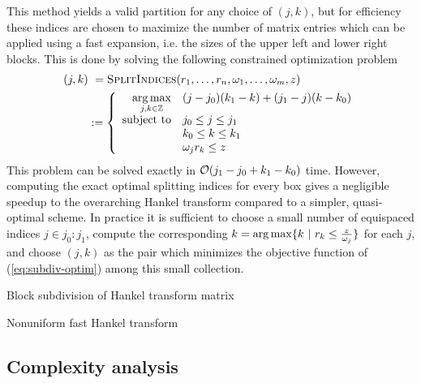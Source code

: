 This method yields a valid partition for any choice of $(j,k)$, but for
efficiency these indices are chosen to maximize the number of matrix entries
which can be applied using a fast expansion, i.e. the sizes of the upper left
and lower right blocks. This is done by solving the following constrained
optimization problem
\begin{align}
    (j,k) 
    &\ = \textsc{SplitIndices}(r_1,\dots,r_n, \omega_1,\dots,\omega_m, z) \\
    &:= \left\{
        \begin{array}{r@{\quad } l}
        \displaystyle\argmax_{j,k\in\Z} & (j-j_0)(k_1-k) + (j_1-j)(k-k_0)   \\
        \text{subject to} & j_0 \leq j \leq j_1 \\ 
        & k_0 \leq k \leq k_1 \\ 
        & \omega_j r_k \leq z
        \end{array}
    \right. \label{eq:subdiv-optim}
\end{align}
This problem can be solved exactly in $\mathcal{O}(j_1-j_0 + k_1-k_0)$ time. However,
computing the exact optimal splitting indices for every box gives a negligible
speedup to the overarching Hankel transform compared to a simpler, quasi-optimal
scheme. In practice it is sufficient to choose a small number of equispaced
indices $j \in j_0:j_1$, compute the corresponding $k = \operatorname*{arg\,max} \{k \ | \ r_k
\leq \frac{z}{\omega_j}\}$ for each $j$, and choose $(j,k)$ as the pair which
minimizes the objective function of (\ref{eq:subdiv-optim}) among this small
collection.

\begin{algorithm2e}[t]
    \caption{Block subdivision of Hankel transform
    matrix}\label{alg:subdivision}
    
\end{algorithm2e}

\begin{algorithm2e}[t]
    \caption{Nonuniform fast Hankel transform}\label{alg:nufht}
    
\end{algorithm2e}

\subsection{Complexity analysis}

